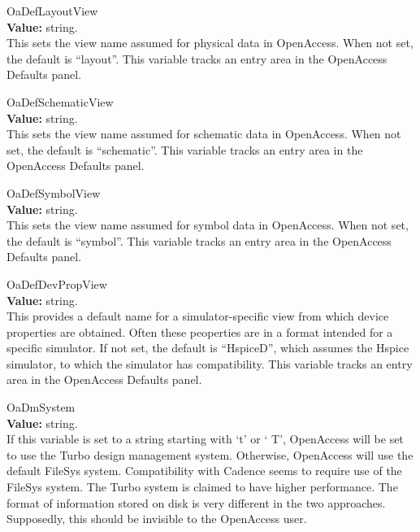 \begin{description}
\item{\et OaDefLayoutView}\\
{\bf Value:} string.\\
This sets the view name assumed for physical data in OpenAccess.  When
not set, the default is ``{\vt layout}''.  This variable tracks an
entry area in the {\cb OpenAccess Defaults} panel.

\item{\et OaDefSchematicView}\\
{\bf Value:} string.\\
This sets the view name assumed for schematic data in OpenAccess. 
When not set, the default is ``{\vt schematic}''.  This variable
tracks an entry area in the {\cb OpenAccess Defaults} panel.

\item{\et OaDefSymbolView}\\
{\bf Value:} string.\\
This sets the view name assumed for symbol data in OpenAccess.  When
not set, the default is ``{\vt symbol}''.  This variable tracks an
entry area in the {\cb OpenAccess Defaults} panel.

\item{\et OaDefDevPropView}\\
{\bf Value:} string.\\
This provides a default name for a simulator-specific view from which
device properties are obtained.  Often these peoperties are in a
format intended for a specific simulator.  If not set, the default is
``{\vt HspiceD}'', which assumes the Hspice simulator, to which the
{\WRspice} simulator has compatibility.  This variable tracks an entry
area in the {\cb OpenAccess Defaults} panel.

\item{\et OaDmSystem}\\
{\bf Value:} string.\\
If this variable is set to a string starting with `{\vt t}' or `{\vt
T}', OpenAccess will be set to use the {\et Turbo} design management
system.  Otherwise, OpenAccess will use the default {\et FileSys}
system.  Compatibility with Cadence seems to require use of the {\et
FileSys} system.  The {\et Turbo} system is claimed to have higher
performance.  The format of information stored on disk is very
different in the two approaches.  Supposedly, this should be invisible
to the OpenAccess user.


\end{description}
